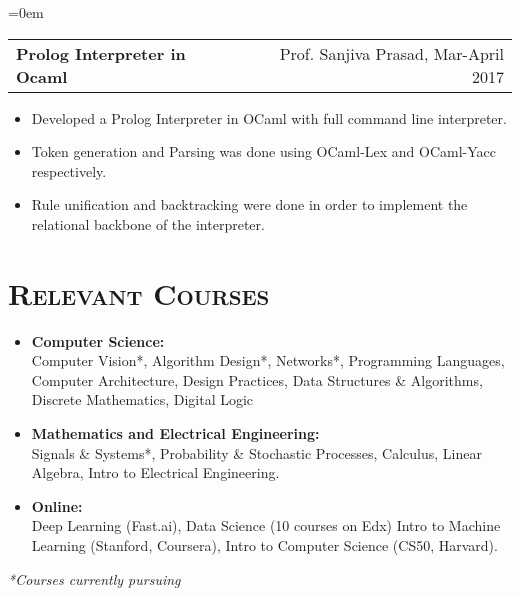 \documentclass{article}
\makeatletter
\newenvironment{longversion}{}{} %
\newcommand{\headerrow}[2]
{\begin{tabular*}{\linewidth}{l@{\extracolsep{\fill}}r}
    #1 &
    #2 \\
\end{tabular*}}
\newcommand{\tmpsection}[1]{}
\let\tmpsection=\section
\renewcommand{\section}[1]{\tmpsection*{\textsc{#1}}}
\makeatother
\begin{document}
\begin{longversion}
\begin{list} {}{\leftmargin=0em}
\item[]
\headerrow {\textbf{Prolog Interpreter in Ocaml}}{Prof. Sanjiva Prasad, Mar-April 2017}
\begin{itemize}
\setlength\itemsep{0.0em}
    \item Developed a Prolog Interpreter in OCaml with full command line interpreter.
    \item Token generation and Parsing was done using OCaml-Lex and OCaml-Yacc respectively.
    \item Rule unification and backtracking were done in order to implement the relational backbone of the interpreter.
\end{itemize}

\end{list}



\end{longversion}

\begin{longversion}
\section{Relevant Courses}
\begin{itemize}
\setlength\itemsep{-1em}
\item \textbf{Computer Science:} \\ 
Computer Vision*, Algorithm Design*, Networks*, Programming Languages, Computer Architecture, Design Practices, Data Structures \& Algorithms, Discrete Mathematics, Digital Logic\\

\item \textbf{Mathematics and Electrical Engineering:} \\
Signals \& Systems*, Probability \& Stochastic Processes, Calculus, Linear Algebra, Intro to Electrical Engineering.\\

\item \textbf{Online:} \\
Deep Learning (Fast.ai), Data Science (10 courses on Edx) Intro to Machine Learning (Stanford, Coursera), Intro to Computer Science (CS50, Harvard).

\end{itemize}

\textit{*Courses currently pursuing}
\end{longversion}
\end{document}
